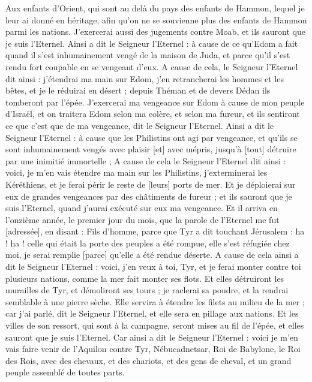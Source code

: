 \begin{multicols}{2}
Aux enfants d'Orient, qui sont au delà du pays des enfants de Hammon, lequel je leur ai donné en héritage, afin qu'on ne se souvienne plus des enfants de Hammon parmi les nations.
J'exercerai aussi des jugements contre Moab, et ils sauront que je suis l'Eternel.
Ainsi a dit le Seigneur l'Eternel : à cause de ce qu'Edom a fait quand il s'est inhumainement vengé de la maison de Juda, et parce qu'il s'est rendu fort coupable en se vengeant d'eux.
A cause de cela, le Seigneur l'Eternel dit ainsi : j'étendrai ma main sur Edom, j'en retrancherai les hommes et les bêtes, et je le réduirai en désert ; depuis Théman et de devers Dédan ils tomberont par l'épée.
J'exercerai ma vengeance sur Edom à cause de mon peuple d'Israël, et on traitera Edom selon ma colère, et selon ma fureur, et ils sentiront ce que c'est que de ma vengeance, dit le Seigneur l'Eternel.
Ainsi a dit le Seigneur l'Eternel : à cause que les Philistins ont agi par vengeance, et qu'ils se sont inhumainement vengés avec plaisir [et] avec mépris, jusqu'à [tout] détruire par une inimitié immortelle ;
A cause de cela le Seigneur l'Eternel dit ainsi : voici, je m'en vais étendre ma main sur les Philistins, j'exterminerai les Kéréthiens, et je ferai périr le reste de [leurs] ports de mer.
Et je déploierai sur eux de grandes vengeances par des châtiments de fureur ; et ils sauront que je suis l'Eternel, quand j'aurai exécuté sur eux ma vengeance.
\VerseOne{}Et il arriva en l'onzième année, le premier jour du mois, que la parole de l'Eternel me fut [adressée], en disant :
Fils d'homme, parce que Tyr a dit touchant Jérusalem : ha ! ha ! celle qui était la porte des peuples a été rompue, elle s'est réfugiée chez moi, je serai remplie [parce] qu'elle a été rendue déserte.
A cause de cela ainsi a dit le Seigneur l'Eternel : voici, j'en veux à toi, Tyr, et je ferai monter contre toi plusieurs nations, comme la mer fait monter ses flots.
Et elles détruiront les murailles de Tyr, et démoliront ses tours ; je raclerai sa poudre, et la rendrai semblable à une pierre sèche.
Elle servira à étendre les filets au milieu de la mer ; car j'ai parlé, dit le Seigneur l'Eternel, et elle sera en pillage aux nations.
Et les villes de son ressort, qui sont à la campagne, seront mises au fil de l'épée, et elles sauront que je suis l'Eternel.
Car ainsi a dit le Seigneur l'Eternel : voici je m'en vais faire venir de l'Aquilon contre Tyr, Nébucadnetsar, Roi de Babylone, le Roi des Rois, avec des chevaux, et des chariots, et des gens de cheval, et un grand peuple assemblé de toutes parts.

\end{multicols}
